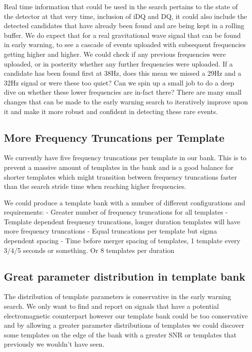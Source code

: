 Real time information that could be used in the search pertains to the state of the detector at that very time, inclusion of iDQ and DQ, it could also include the detected candidates that have already been found and are being kept in a rolling buffer. We do expect that for a real gravitational wave signal that can be found in early warning, to see a cascade of events uploaded with subsequent frequencies getting higher and higher. We could check if any previous frequencies were uploaded, or in posterity whether any further frequencies were uploaded. If a candidate has been found first at 38Hz, does this mean we missed a 29Hz and a 32Hz signal or were these too quiet? Can we spin up a small job to do a deep dive on whether these lower frequencies are in-fact there? There are many small changes that can be made to the early warning search to iteratively improve upon it and make it more robust and confident in detecting these rare events.

\subsection{More Frequency Truncations per Template}
We currently have five frequency truncations per template in our bank. This is to prevent a massive amount of templates in the bank and is a good balance for shorter templates which might transition between frequency truncations faster than the search stride time when reaching higher frequencies.

We could produce a template bank with a number of different configurations and requirements:
- Greater number of frequency truncations for all templates
- Template dependent frequency truncations, longer duration templates will have more frequency truncations
- Equal truncations per template but sigma dependent spacing
- Time before merger spacing of templates, 1 template every 3/4/5 seconds or something. Or 8 templates per duration

\subsection{Great parameter distribution in template bank}
The distribution of template parameters is conservative in the early warning search. We only want to find and report on signals that have a potential electromagnetic counterpart however our template bank could be too conservative and by allowing a greater parameter distributions of templates we could discover some templates on the edge of the bank with a greater SNR or templates that previously we wouldn't have seen.

